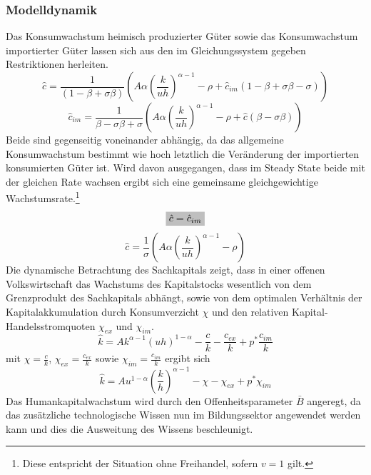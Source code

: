 \subsubsection*{Modelldynamik}
Das Konsumwachstum heimisch produzierter Güter sowie das Konsumwachstum importierter Güter lassen sich aus den im Gleichungssystem gegeben Restriktionen herleiten.
%
\begin{equation}
	\hat{c}=\frac{1}{(1-\beta+\sigma\beta)}\left(A\alpha \left(\frac{k}{uh}\right)^{\alpha -1}-\rho+\hat{c}_{im}(1-\beta+\sigma\beta-\sigma)\right)
\end{equation}
%
\begin{equation}
	\hat{c}_{im}=\frac{1}{\beta-\sigma\beta+ \sigma}\left(A\alpha \left(\frac{k}{uh}\right)^{\alpha -1}-\rho+\hat{c}(\beta - \sigma\beta)\right)
\end{equation}
%
Beide sind gegenseitig voneinander abhängig, da das allgemeine Konsumwachstum bestimmt wie hoch letztlich die Veränderung der importierten konsumierten Güter ist. Wird davon ausgegangen, dass im Steady State beide mit der gleichen Rate wachsen ergibt sich eine gemeinsame gleichgewichtige Wachstumsrate.\footnote{Diese entspricht der Situation ohne Freihandel, sofern $v=1$ gilt.}
%
\begin{equation*}
	\colorbox{lightgray}{$\hat{c}=\hat{c}_{im}$}
\end{equation*}
%
\vspace{-0.5cm}
%
\begin{equation}
	\hat{c}=\frac{1}{\sigma}\left(A\alpha\left(\frac{k}{uh}\right)^{\alpha-1}-\rho\right)
\end{equation}
%
Die dynamische Betrachtung des Sachkapitals zeigt, dass in einer offenen Volkswirtschaft das Wachstums des Kapitalstocks wesentlich von dem Grenzprodukt des Sachkapitals abhängt, sowie von dem optimalen Verhältnis der Kapitalakkumulation durch Konsumverzicht $\chi$ und den relativen Kapital-Handelsstromquoten $\chi_{ex}$ und $\chi_{im}$. 
%
\begin{equation*}
	\hat{k}=A k^{\alpha-1}(uh)^{1-\alpha}-\frac{c}{k}-\frac{c_{ex}}{k}+p^*\frac{c_{im}}{k}
\end{equation*}
%
mit $\chi=\frac{c}{k}$, $\chi_{ex}=\frac{c_{ex}}{k}$ sowie $\chi_{im}=\frac{c_{im}}{k}$ ergibt sich
%
\begin{equation}
	\boxed{\hat{k}=A u^{1-\alpha}\left(\frac{k}{h}\right)^{\alpha-1}-\chi-\chi_{ex}+p^*\chi_{im}}
\end{equation}
%
Das Humankapitalwachstum wird durch den Offenheitsparameter $\bar{B}$ angeregt, da das zusätzliche technologische Wissen nun im Bildungssektor angewendet werden kann und dies die Ausweitung des Wissens beschleunigt.
